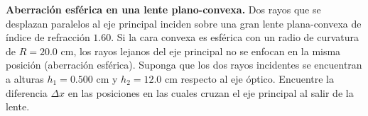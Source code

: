 \item \textbf{Aberración esférica en una lente plano-convexa.}
Dos rayos que se desplazan paralelos al eje principal inciden sobre una gran lente plana-convexa de índice de refracción $1.60$. Si la cara convexa es esférica con un radio de curvatura de $R = 20.0\text{ cm}$, los rayos lejanos del eje principal no se enfocan en la misma posición (aberración esférica). Suponga que los dos rayos incidentes se encuentran a alturas $h_1 = 0.500\text{ cm}$ y $h_2 = 12.0\text{ cm}$ respecto al eje óptico. Encuentre la diferencia $\Delta x$ en las posiciones en las cuales cruzan el eje principal al salir de la lente.